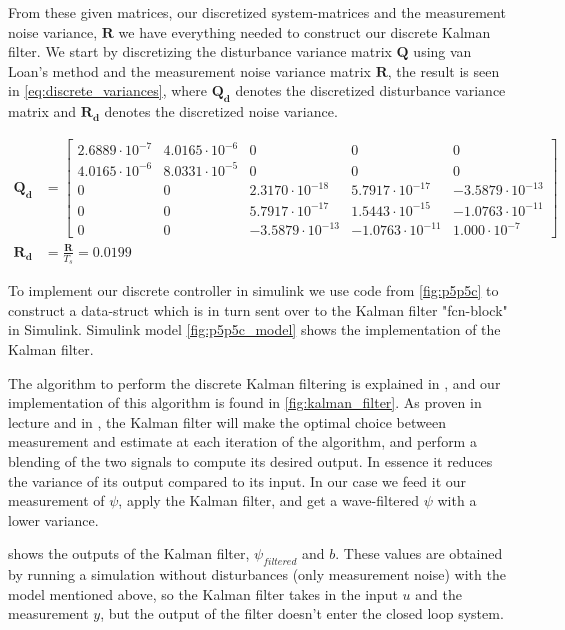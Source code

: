 From these given matrices, our discretized system-matrices and the measurement noise variance, $\mathbf{R}$ we have everything needed to construct our discrete Kalman filter. We start by discretizing the disturbance variance matrix $\mathbf{Q}$ using van Loan's method\cite{kalman} and the measurement noise variance matrix $\mathbf{R}$, the result is seen in \cref{eq:discrete_variances}, where $\mathbf{Q_d}$ denotes the discretized disturbance variance matrix and $\mathbf{R_d}$ denotes the discretized noise variance.

\begin{equation}\label{eq:discrete_variances}
\begin{aligned}
    \mathbf{Q_d}&=
    \begin{bmatrix}
        2.6889\cdot10^{-7} & 4.0165\cdot10^{-6} & 0 & 0 & 0 \\
        4.0165\cdot10^{-6} & 8.0331\cdot10^{-5} & 0 & 0 & 0 \\
        0 & 0 & 2.3170\cdot10^{-18} & 5.7917\cdot10^{-17} & -3.5879\cdot10^{-13} \\
        0 & 0 & 5.7917\cdot10^{-17} & 1.5443\cdot10^{-15} & -1.0763\cdot10^{-11} \\
        0 & 0 & -3.5879\cdot10^{-13} & -1.0763\cdot10^{-11} & 1.000\cdot10^{-7}
    \end{bmatrix}
    \\
    \mathbf{R_d}&= \frac{\mathbf{R}}{T_s}= 0.0199
\end{aligned}
\end{equation}

To implement our discrete controller in simulink we use code from \cref{fig:p5p5c} to construct a data-struct which is in turn  sent over to the Kalman filter "fcn-block" in Simulink. Simulink model \cref{fig:p5p5c_model} shows the implementation of the Kalman filter.

The algorithm to perform the discrete Kalman filtering is explained in \cite{kalman}, and our implementation of this algorithm is found in \cref{fig:kalman_filter}. As proven in lecture and in \cite{kalman}, the Kalman filter will make the optimal choice between measurement and estimate at each iteration of the algorithm, and perform a blending of the two signals to compute its desired output. In essence it reduces the variance of its output compared to its input. In our case we feed it our measurement of $\psi$, apply the Kalman filter, and get a wave-filtered $\psi$ with a lower variance.

 shows the outputs of the Kalman filter, $\psi_{filtered}$ and $b$. These values are obtained by running a simulation without disturbances (only measurement noise) with the model mentioned above, so the Kalman filter takes in the input $u$ and the measurement $y$, but the output of the filter doesn't enter the closed loop system.


